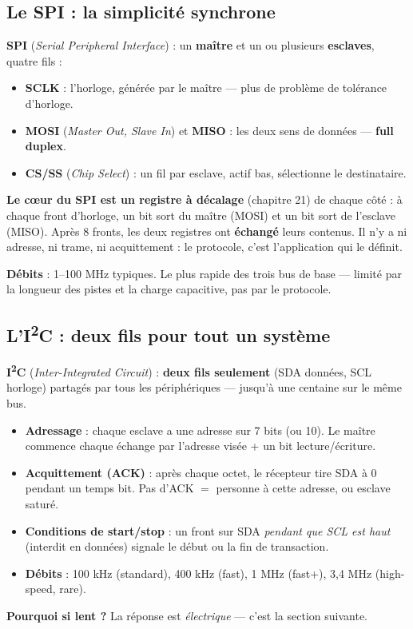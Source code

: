 \documentclass[12pt,a4paper,twoside]{book}
\begin{document}
\subsection{Le SPI : la simplicité synchrone}

\begin{formule}
\textbf{SPI} (\textit{Serial Peripheral Interface}) : un \textbf{maître} et un ou plusieurs \textbf{esclaves}, quatre fils :
\begin{itemize}[nosep]
\item \textbf{SCLK} : l'horloge, générée par le maître --- plus de problème de tolérance d'horloge.
\item \textbf{MOSI} (\textit{Master Out, Slave In}) et \textbf{MISO} : les deux sens de données --- \textbf{full duplex}.
\item \textbf{CS/SS} (\textit{Chip Select}) : un fil par esclave, actif bas, sélectionne le destinataire.
\end{itemize}

\textbf{Le cœur du SPI est un registre à décalage} (chapitre 21) de chaque côté : à chaque front d'horloge, un bit sort du maître (MOSI) et un bit sort de l'esclave (MISO). Après 8 fronts, les deux registres ont \textbf{échangé} leurs contenus. Il n'y a ni adresse, ni trame, ni acquittement : le protocole, c'est l'application qui le définit.

\textbf{Débits} : 1--100 MHz typiques. Le plus rapide des trois bus de base --- limité par la longueur des pistes et la charge capacitive, pas par le protocole.
\end{formule}

\subsection{L'I\textsuperscript{2}C : deux fils pour tout un système}

\begin{formule}
\textbf{I\textsuperscript{2}C} (\textit{Inter-Integrated Circuit}) : \textbf{deux fils seulement} (SDA données, SCL horloge) partagés par tous les périphériques --- jusqu'à une centaine sur le même bus.

\begin{itemize}[nosep]
\item \textbf{Adressage} : chaque esclave a une adresse sur 7 bits (ou 10). Le maître commence chaque échange par l'adresse visée + un bit lecture/écriture.
\item \textbf{Acquittement (ACK)} : après chaque octet, le récepteur tire SDA à 0 pendant un temps bit. Pas d'ACK $=$ personne à cette adresse, ou esclave saturé.
\item \textbf{Conditions de start/stop} : un front sur SDA \textit{pendant que SCL est haut} (interdit en données) signale le début ou la fin de transaction.
\item \textbf{Débits} : 100 kHz (standard), 400 kHz (fast), 1 MHz (fast+), 3,4 MHz (high-speed, rare).
\end{itemize}

\textbf{Pourquoi si lent ?} La réponse est \textit{électrique} --- c'est la section suivante.
\end{formule}
\end{document}
